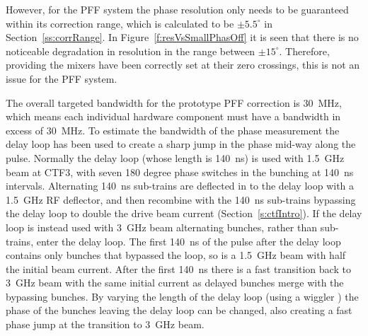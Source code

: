 However, for the PFF system the phase resolution only needs to be guaranteed within its correction range, which is calculated to be \(\pm5.5^\circ\) in Section~\ref{ss:corrRange}. In Figure~\ref{f:resVsSmallPhasOff} it is seen that there is no noticeable degradation in resolution in the range between \(\pm15^\circ\). Therefore, providing the mixers have been correctly set at their zero crossings, this is not an issue for the PFF system.






The overall targeted bandwidth for the prototype PFF correction is 30~MHz, which means each individual hardware component must have a bandwidth in excess of 30~MHz. To estimate the bandwidth of the phase measurement the delay loop has been used to create a sharp jump in the phase mid-way along the pulse. Normally the delay loop (whose length is 140~ns) is used with 1.5~GHz beam at CTF3, with seven 180 degree phase switches in the bunching at 140~ns intervals. Alternating 140~ns sub-trains are deflected in to the delay loop with a 1.5~GHz RF deflector, and then recombine with the 140~ns sub-trains bypassing the delay loop to double the drive beam current (Section~\ref{s:ctfIntro}). If the delay loop is instead used with 3~GHz beam alternating bunches, rather than sub-trains, enter the delay loop. The first 140~ns of the pulse after the delay loop contains only bunches that bypassed the loop, so is a 1.5~GHz beam with half the initial beam current. After the first 140~ns there is a fast transition back to 3~GHz beam with the same initial current as delayed bunches merge with the bypassing bunches. By varying the length of the delay loop (using a wiggler \cite{wiggler}) the phase of the bunches leaving the delay loop can be changed, also creating a fast phase jump at the transition to 3~GHz beam.

